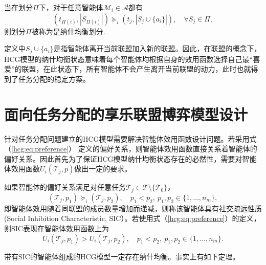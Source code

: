 \begin{definition}[HCG模型的纳什均衡]
	当在划分$\Pi$下，对于任意智能体$\mathcal{M}_i \in \mathcal{A}$都有
	\begin{equation}
	\label{hcg:eq:nash_stable}
		(t_{\Pi(i)},|S_{\Pi(i)}|) \succeq_i (t_j,|S_j \cup \{a_i\}|),\quad \forall S_j \in \Pi,
	\end{equation}
	则划分$\Pi$被称为是纳什均衡划分.
\end{definition}

定义中$S_j\cup \{a_i\}$是指智能体离开当前联盟加入新的联盟。因此，在联盟的概念下，HCG模型的纳什均衡状态意味着每个智能体均根据自身的效用函数选择自己最“喜爱”的联盟，在此状态下，所有智能体不会产生离开当前联盟的动力，此时也就得到了任务分配的稳定方案。



\section{面向任务分配的享乐联盟博弈模型设计}
\label{hcg:HGTA}


针对任务分配问题建立的HCG模型需要解决智能体效用函数设计问题。若采用式（\ref{hcg:eq:preference}） 定义的偏好关系，则智能体效用函数直接关系着智能体的偏好关系。因此首先为了保证HCG模型纳什均衡状态存在的必然性，需要对智能体效用函数$U_i(\mathcal{T}_j,p)$做出一定的要求。

\begin{definition}[社交疏远性质]
\label{hcg:eq:spao}
	如果智能体的偏好关系满足对任意任务$\mathcal{T}_j \in \mathcal{T} \setminus \{\mathcal{T}_0\}$，
	\begin{equation}
	\label{hcg:eq:spaoPrefer}
		(\mathcal{T}_j,p_1) \succeq_i (\mathcal{T}_j,p_2),\quad p_1 < p_2,\ p_1,p_2 \in \{1,\dots,n_m\},
	\end{equation}
	即智能体效用随着同联盟的成员数量增加而递减，则称该智能体具有社交疏远性质(Social Inhibition Characteristic, SIC）。若使用式（\ref{hcg:eq:preference}）的定义，则SIC表现在智能体效用函数上为
	\begin{equation}
	\label{hcg:eq:spaoU}
		U_i(\mathcal{T}_j,p_1) > U_i(\mathcal{T}_j,p_2),\quad p_1<p_2,\ p_1,p_2 \in \{1,\dots,n_m\}.
	\end{equation}
\end{definition}

带有SIC的智能体组成的HCG模型一定存在纳什均衡。事实上有如下定理。

